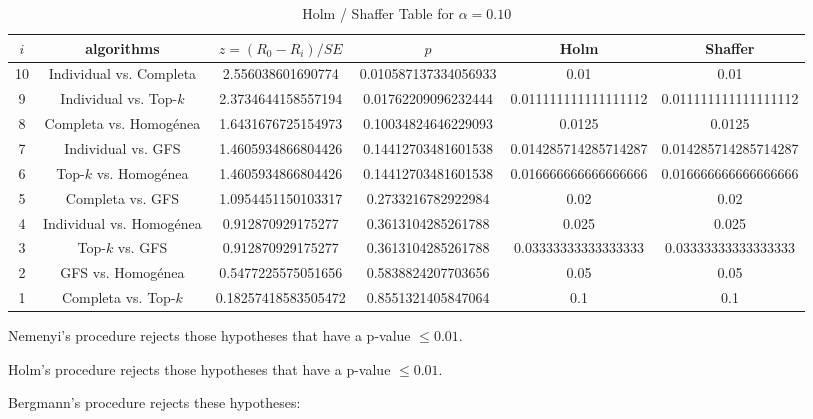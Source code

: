 \documentclass[a4paper,10pt]{article}
\begin{document}
\begin{landscape}
\begin{table}[!htp]
\centering\tiny
\caption{Holm / Shaffer Table for $\alpha=0.10$}
\begin{tabular}{cccccc}
$i$&algorithms&$z=(R_0 - R_i)/SE$&$p$&Holm&Shaffer\\
\hline
10&Individual vs. Completa&2.556038601690774&0.010587137334056933&0.01&0.01\\
9&Individual vs. Top-$k$&2.3734644158557194&0.01762209096232444&0.011111111111111112&0.011111111111111112\\
8&Completa vs. Homogénea&1.6431676725154973&0.10034824646229093&0.0125&0.0125\\
7&Individual vs. GFS&1.4605934866804426&0.14412703481601538&0.014285714285714287&0.014285714285714287\\
6&Top-$k$ vs. Homogénea&1.4605934866804426&0.14412703481601538&0.016666666666666666&0.016666666666666666\\
5&Completa vs. GFS&1.0954451150103317&0.2733216782922984&0.02&0.02\\
4&Individual vs. Homogénea&0.912870929175277&0.3613104285261788&0.025&0.025\\
3&Top-$k$ vs. GFS&0.912870929175277&0.3613104285261788&0.03333333333333333&0.03333333333333333\\
2&GFS vs. Homogénea&0.5477225575051656&0.5838824207703656&0.05&0.05\\
1&Completa vs. Top-$k$&0.18257418583505472&0.8551321405847064&0.1&0.1\\
\hline
\end{tabular}
\end{table}
Nemenyi's procedure rejects those hypotheses that have a p-value $\le0.01$.


Holm's procedure rejects those hypotheses that have a p-value $\le0.01$.


Bergmann's procedure rejects these hypotheses:


\begin{itemize}


\end{itemize}



\end{landscape}
\end{document}
